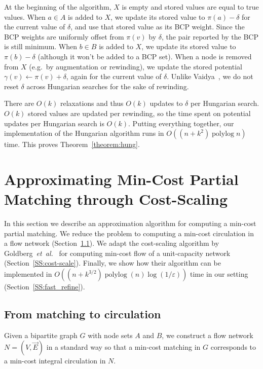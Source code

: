 \documentclass[a4paper,UKenglish]{socg-lipics-v2019}
\def\etal{\emph{et~al.}}
\def\etal{\textit{et~al.}}
\def\polylog{\mathop{\mathrm{polylog}}}
\def\eps{\varepsilon}
\def\Paren#1{\left( #1 \right)}		%
\theoremstyle{plain}
\numberwithin{figure}{section}
\begin{document}
At the beginning of the algorithm, $X$ is empty and stored values are equal to
true values.
When $a \in A$ is added to $X$, we update its stored value to $\pi(a) - \delta$
for the current value of $\delta$, and use that stored value as its BCP weight.
Since the BCP weights are uniformly offset from $\pi(v)$ by $\delta$, the pair
reported by the BCP is still minimum.
When $b \in B$ is added to $X$, we update its stored value to $\pi(b) - \delta$
(although it won't be added to a BCP set).
When a node is removed from $X$ (e.g.\ by augmentation or rewinding), we update
the stored potential $\gamma(v) \gets \pi(v) + \delta$, again for the current
value of $\delta$.
Unlike Vaidya~\cite{Vaidya89}, we do not reset $\delta$ across Hungarian searches
for the sake of rewinding.

There are $O(k)$ relaxations and thus $O(k)$ updates to $\delta$ per Hungarian search.
$O(k)$ stored values are updated per rewinding, so the time spent on potential
updates per Hungarian search is $O(k)$.
Putting everything together, our implementation of the Hungarian algorithm runs
in $O((n + k^2)\polylog n)$ time.
This proves Theorem~\ref{theorem:hung}.


\section{Approximating Min-Cost Partial Matching through Cost-Scaling}
\label{section:goldberg}

In this section we describe an approximation algorithm for computing a min-cost
partial matching.
We reduce the problem to computing a min-cost circulation in a flow network
(Section~\ref{SS:match-flow-red}).
We adapt the cost-scaling algorithm by Goldberg~\etal~\cite{GHKT17} for
computing min-cost flow of a unit-capacity network (Section~\ref{SS:cost-scale}).
Finally, we show how their algorithm can be implemented in
$O\Paren{(n + k^{3/2})\polylog(n)\log(1/\eps)}$ time in our setting (Section~\ref{SS:fast_refine}).

\subsection{From matching to circulation}
\label{SS:match-flow-red}

Given a bipartite graph $G$ with node sets $A$ and $B$, we construct a flow network
$N = (V, \vec{E})$ in a standard way \cite{RT12}
so that a min-cost matching in $G$ corresponds to a min-cost integral
circulation in $N$.
\end{document}
